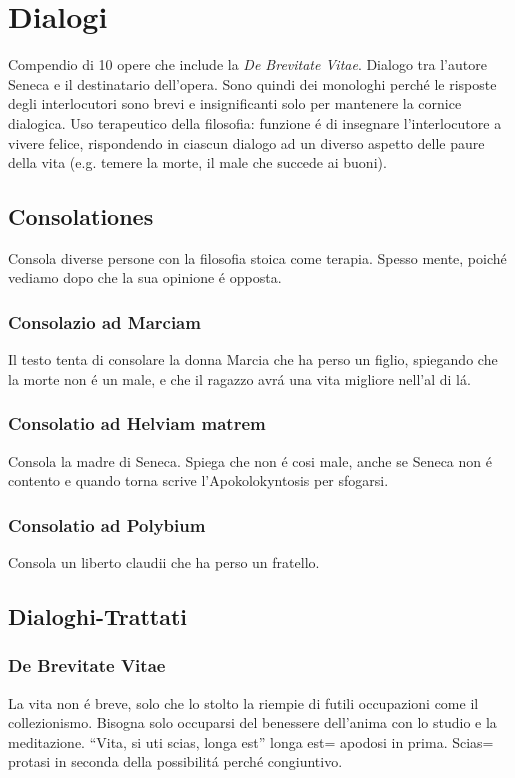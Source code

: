 \documentclass{article}
\begin{document}
\section{Dialogi}
Compendio di 10 opere che include la \textit{De Brevitate Vitae}. Dialogo tra l'autore Seneca e il destinatario dell'opera. Sono quindi dei monologhi perché le risposte degli interlocutori sono brevi e insignificanti solo per mantenere la cornice dialogica. Uso terapeutico della filosofia: funzione é di insegnare l'interlocutore a vivere felice, rispondendo in ciascun dialogo ad un diverso aspetto delle paure della vita (e.g. temere la morte, il male che succede ai buoni).

\subsection{Consolationes}
Consola diverse persone con la filosofia stoica come terapia. Spesso mente, poiché vediamo dopo che la sua opinione é opposta.

\subsubsection{Consolazio ad Marciam}
Il testo tenta di consolare la donna Marcia che ha perso un figlio, spiegando che la morte non é un male, e che il ragazzo avrá una vita migliore nell'al di lá.

\subsubsection{Consolatio ad Helviam matrem}
Consola la madre di Seneca. Spiega che non é cosi male, anche se Seneca non é contento e quando torna scrive l'Apokolokyntosis per sfogarsi.

\subsubsection{Consolatio ad Polybium}
Consola un liberto claudii che ha perso un fratello.

\subsection{Dialoghi-Trattati}

\subsubsection{De Brevitate Vitae}
La vita non é breve, solo che lo stolto la riempie di futili occupazioni come il collezionismo. Bisogna solo occuparsi del benessere dell'anima con lo studio e la meditazione. ``Vita, si uti scias, longa est'' longa est= apodosi in prima. Scias= protasi in seconda della possibilitá perché congiuntivo.
\end{document}
